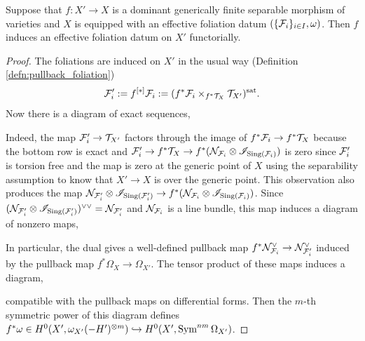 \documentclass[main.tex]{subfiles}
\begin{document}
{\begin{prop} \label{prop:pullback_effective_foliation_data}
Suppose that $f : X' \to X$ is a dominant generically finite separable morphism of varieties and $X$ is equipped with an effective foliation datum $(\{ \mathcal{F}_i \}_{i \in I}, \omega)$. Then $f$ induces an effective foliation datum on $X'$ functorially.
\end{prop}

\begin{proof}
The foliations are induced on $X'$ in the usual way (Definition \ref{defn:pullback_foliation})
\[ \mathcal{F}_i' := f^{[*]} \mathcal{F}_i := (f^* \mathcal{F}_i \times_{f^* \mathcal{T}_X} \mathcal{T}_{X'})^{\text{sat}}. \] 
Now there is a diagram of exact sequences,
\begin{center}
\end{center}
Indeed, the map $\mathcal{F}_i' \to \mathcal{T}_{X'}$ factors through the image of $f^* \mathcal{F}_i \to f^* \mathcal{T}_X$ because the bottom row is exact and $\mathcal{F}_i' \to f^* \mathcal{T}_X \to f^* (\mathcal{N}_{\mathcal{F}_i} \otimes \mathscr{I}_{\operatorname{\mathrm{Sing}}(\mathcal{F}_i)})$ is zero since $\mathcal{F}_i'$ is torsion free and the map is zero at the generic point of $X$ using the separability assumption to know that $X' \to X$ is \etale over the generic point. This observation also produces the map $\mathcal{N}_{\mathcal{F}_i'} \otimes \mathscr{I}_{\operatorname{\mathrm{Sing}}(\mathcal{F}_i')} \to f^* (\mathcal{N}_{\mathcal{F}_i} \otimes \mathscr{I}_{\operatorname{\mathrm{Sing}}(\mathcal{F}_i)})$. Since $(\mathcal{N}_{\mathcal{F}_i'} \otimes \mathscr{I}_{\operatorname{\mathrm{Sing}}(\mathcal{F}_i')})^{\vee \vee} = \mathcal{N}_{\mathcal{F}_i'}$ and $\mathcal{N}_{\mathcal{F}_i}$ is a line bundle, this map induces a diagram of nonzero maps,
\begin{center}
\end{center}
In particular, the dual gives a well-defined pullback map $f^* \mathcal{N}_{\mathcal{F}_i}^{\vee} \to \mathcal{N}_{\mathcal{F}_i'}^{\vee}$ induced by the pullback map $f^* \Omega_X \to \Omega_{X'}$. The tensor product of these maps induces a diagram,
\begin{center}
\end{center}
compatible with the pullback maps on differential forms. Then the $m$-th symmetric power of this diagram defines $f^* \omega \in H^0(X', \omega_{X'}(-H')^{\otimes m}) \hookrightarrow H^0(X', \operatorname{\mathrm{Sym}}^{nm} \Omega_{X'})$.
\end{proof}

}
\end{document}
